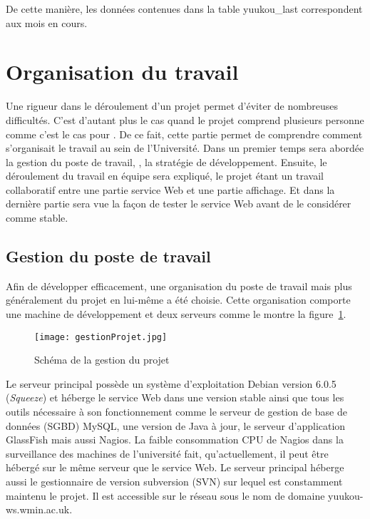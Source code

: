 De cette mani\`ere, les donn\'ees contenues dans la table \textsf{yuukou\_last} correspondent aux mois en cours.


\section{Organisation du travail}

Une rigueur dans le d\'eroulement d'un projet permet d'\'eviter de nombreuses difficult\'es.
C'est d'autant plus le cas quand le projet comprend plusieurs personne comme c'est le cas pour {\YuukouII}.
De ce fait, cette partie permet de comprendre comment s'organisait le travail au sein de l'Universit\'e.
Dans un premier temps sera abord\'ee la gestion du poste de travail, \cad, la strat\'egie de d\'eveloppement.
Ensuite, le d\'eroulement du travail en \'equipe sera expliqu\'e, le projet \'etant un travail collaboratif entre une partie service Web et une partie affichage.
Et dans la derni\`ere partie sera vue la fa\c{c}on de tester le service Web avant de le consid\'erer comme stable.

\subsection{Gestion du poste de travail}
\label{section:gestionProjet}

Afin de d\'evelopper efficacement, une organisation du poste de travail mais plus g\'en\'eralement du projet en lui-m\^eme a \'et\'e choisie.
Cette organisation comporte une machine de d\'eveloppement et deux serveurs comme le montre la figure~\ref{figure:gestionProjet}.

\begin{figure}[!ht]
	\centering
	\texttt{[image: gestionProjet.jpg]}
	\caption{Sch\'ema de la gestion du projet}
	\label{figure:gestionProjet}

\end{figure}

Le serveur principal poss\`ede un syst\`eme d'exploitation Debian version 6.0.5 (\textit{Squeeze}) et h\'eberge le service Web dans une version stable ainsi que tous les outils n\'ecessaire \`a son fonctionnement comme le serveur de gestion de base de donn\'ees (SGBD) MySQL, une version de Java \`a jour, le serveur d'application GlassFish mais aussi Nagios.
La faible consommation CPU de Nagios dans la surveillance des machines de l'universit\'e fait, qu'actuellement, il peut \^etre h\'eberg\'e sur le m\^eme serveur que le service Web.
Le serveur principal h\'eberge aussi le gestionnaire de version subversion (SVN) sur lequel est constamment maintenu le projet.
Il est accessible sur le r\'eseau sous le nom de domaine \textsf{yuukou-ws.wmin.ac.uk}.

